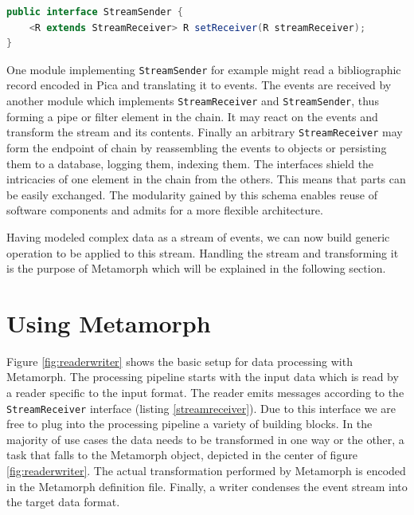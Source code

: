 \documentclass[12pt,a4paper]{article}
\begin{document}
\begin{lstlisting}[float=htb, label=streamsender,caption={The interface of an event stream sender. By virtue of the template R we can efficiently define processing chains via method chaining. See listing \ref{codepipeline2} for examples.}, language=Java]
public interface StreamSender {
	<R extends StreamReceiver> R setReceiver(R streamReceiver);
}
\end{lstlisting}

One module implementing {\tt StreamSender} for example might read a bibliographic record encoded in Pica and translating it to events. 
The events are received by another module which implements {\tt StreamReceiver} and {\tt StreamSender}, thus forming a pipe or filter element in the chain. 
It may react on the events and transform the stream and its contents. Finally an arbitrary {\tt StreamReceiver} may form the endpoint of chain by reassembling the events to objects or persisting them to a database, logging them, indexing them. The interfaces shield the intricacies of one element in the chain from the others. This means that parts can be easily exchanged. The modularity gained by this schema enables reuse of software components and admits for a more flexible architecture.

Having modeled complex data as a stream of events, we can now build generic operation to be applied to this stream. Handling the stream and transforming it is the purpose of Metamorph which will be explained in the following section.




\section{Using Metamorph}

Figure \ref{fig:readerwriter} shows the basic setup for data processing with Metamorph. The processing pipeline starts with the input data which is read by a reader specific to the input format. The reader emits messages according to the {\tt StreamReceiver} interface (listing \ref{streamreceiver}). Due to this interface we are free to plug into the processing pipeline a variety of building blocks. In the majority of use cases the data needs to be transformed in one way or the other, a task that falls to the Metamorph object, depicted in the center of figure  \ref{fig:readerwriter}. The actual transformation performed by Metamorph is encoded in the Metamorph definition file. Finally, a writer condenses the event stream into the target data format.
\end{document}
